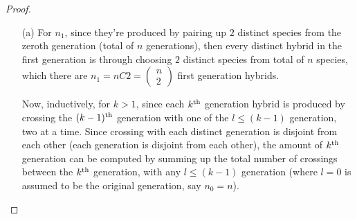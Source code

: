 \documentclass{article}
\begin{document}
\begin{proof}
    
    \hfil

    \begin{itemize}
        \item[(a)] For $n_1$, since they're produced by pairing up $2$ distinct species from the zeroth generation (total of $n$ generations), then every distinct hybrid in the first generation is through choosing $2$ distinct species from total of $n$ species, which there are $n_1 = nC2 = \begin{pmatrix}n\\2\end{pmatrix}$ first generation hybrids.
        
        Now, inductively, for $k>1$, since each $k^\textmd{th}$ generation hybrid is produced by crossing the $(k-1)^\textmd{th}$ generation with one of the $l\leq (k-1)$ generation, two at a time. Since crossing with each distinct generation is disjoint from each other (each generation is disjoint from each other), the amount of $k^\textmd{th}$ generation can be computed by summing up the total number of crossings between the $k^\textmd{th}$ generation, with any $l\leq (k-1)$ generation (where $l=0$ is assumed to be the original generation, say $n_0=n$).


\end{itemize}
\end{proof}
\end{document}
